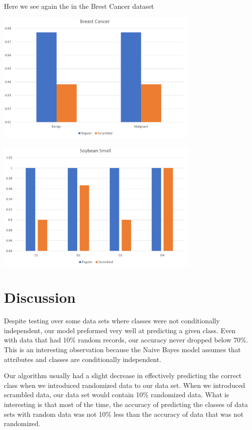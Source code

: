 \documentclass[twoside,11pt]{article}
\begin{document}
Here we see again the in the Brest Cancer dataset
\begin{center}
\includegraphics[width=10cm]{breastCan.png}


\includegraphics[width=10cm]{soybean.png}
\end{center}




\section{Discussion}

Despite testing over some data sets where classes were not conditionally independent, our model preformed very well at predicting a given class. Even with data that had 10\% random records, our accuracy never dropped below 70\%. This is an interesting observation because the Naive Bayes model assumes that attributes and classes are conditionally independent.

Our algorithm usually had a slight decrease in effectively predicting the correct class when we introduced randomized data to our data set. When we introduced scrambled data, our data set would contain 10\% randomized data. What is interesting is that most of the time, the accuracy of predicting the classes of data sets with random data was not 10\% less than the accuracy of data that was not randomized.
\end{document}
